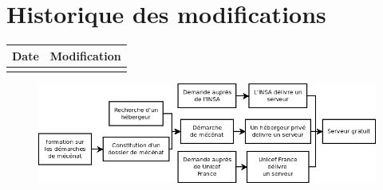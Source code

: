 \section*{Historique des modifications}
\begin{table}[h]
\centering
	\begin{tabularx}{16.8cm}{|X|X|}
	\hline
	\rowcolor{gray!40} Date & Modification \\
	\hline
	  & \\
	\hline
	\end{tabularx}
\end{table}
\newpage


\begin{figure}
	\centering
	\includegraphics[scale=0.35]{images/AnalyseOpportunite_nPourquoi_FDO001}
\end{figure}
